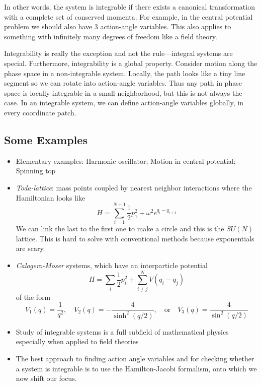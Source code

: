 \documentclass[12pt]{article} %
\begin{document}
In other words, the system is integrable if there exists a canonical transformation with a complete set of conserved momenta. For example, in the central potential problem we should also have 3 action-angle variables. This also applies to something with infinitely many degrees of freedom like a field theory. 

Integrability is really the exception and not the rule---integral systems are special. Furthermore, integrability is a global property. Consider motion along the phase space in a non-integrable system. Locally, the path looks like a tiny line segment so we can rotate into action-angle variables. Thus any path in phase space is locally integrable in a small neighborhood, but this is not always the case. In an integrable system, we can define action-angle variables globally, in every coordinate patch. 


\subsection{Some Examples}

\begin{itemize}
\item Elementary examples: Harmonic oscillator; Motion in central potential; Spinning top

\item \textit{Toda-lattice}: mass points coupled by nearest neighbor interactions where the Hamiltonian looks like
\begin{equation}
H = \sum_{i = 1}^{N+1} \frac{1}{2} p_1^2 + \omega^2 e^{q_i - q_{i+1}}
\end{equation}
We can link the last to the first one to make a circle and this is the $SU(N)$ lattice. This is hard to solve with conventional methods because exponentials are scary. 

\item \textit{Calogero-Moser} systems, which have an interparticle potential
\begin{equation}
H = \sum_i \frac{1}{2} p_i^2 + \sum_{i\ne j}^N V(q_i - q_j)
\end{equation}
of the form
\begin{equation}
V_1(q) = \frac{1}{q^2}, \quad
V_2(q) = -\frac{4}{\sinh^2 (q/2)}, \quad
\text{or} \quad
V_3(q) = \frac{4}{\sin^2 (q/2)}
\end{equation}

\item Study of integrable systems is a full subfield of mathematical physics especially when applied to field theories

\item The best approach to finding action angle variables and for checking whether a system is integrable is to use the Hamilton-Jacobi formalism, onto which we now shift our focus. 

\end{itemize}
\end{document}

